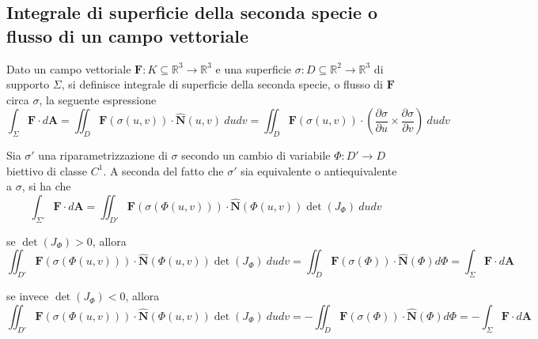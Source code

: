     \subsection{Integrale di superficie della seconda specie o flusso di un campo vettoriale}
        Dato un campo vettoriale $\mathbf{F}: K \subseteq \mathbb{R}^{3} \rightarrow \mathbb{R}^{3}$ e una superficie $\sigma: D \subseteq \mathbb{R}^{2} \rightarrow \mathbb{R}^{3}$ di supporto $\Sigma$, si definisce integrale di superficie della seconda specie, o flusso di $\mathbf{F}$ circa $\sigma$, la seguente espressione
        \[
            \int_{\Sigma} \mathbf{F} \cdot d\mathbf{A} = \iint_{D} \mathbf{F}(\sigma(u, v)) \cdot \mathbf{\hat{N}}(u, v) \: du dv = \iint_{D} \mathbf{F}(\sigma(u, v)) \cdot \left( \frac{\partial \sigma}{\partial u} \times \frac{\partial \sigma}{\partial v} \right) \: du dv
        \]

        Sia $\sigma'$ una riparametrizzazione di $\sigma$ secondo un cambio di variabile $\Phi: D' \rightarrow D$ biettivo di classe $C^{1}$.
        A seconda del fatto che $\sigma'$ sia equivalente o antiequivalente a $\sigma$, si ha che
        \[
            \int_{\Sigma'} \mathbf{F} \cdot d\mathbf{A} = \iint_{D'} \mathbf{F}(\sigma(\Phi(u, v))) \cdot \mathbf{\hat{N}}(\Phi(u, v))  \det(J_{\Phi}) \: du dv
        \]

        se $\det(J_{\Phi}) > 0$, allora
        \[
            \iint_{D'} \mathbf{F}(\sigma(\Phi(u, v))) \cdot \mathbf{\hat{N}}(\Phi(u, v))  \det(J_{\Phi}) \: du dv = \iint_{D} \mathbf{F}(\sigma(\Phi)) \cdot \mathbf{\hat{N}}(\Phi) d \Phi = \int_{\Sigma} \mathbf{F} \cdot d \mathbf{A}
        \]

        se invece $\det(J_{\Phi}) < 0$, allora
        \[
            \iint_{D'} \mathbf{F}(\sigma(\Phi(u, v))) \cdot \mathbf{\hat{N}}(\Phi(u, v))  \det(J_{\Phi}) \: du dv = - \iint_{D} \mathbf{F}(\sigma(\Phi)) \cdot \mathbf{\hat{N}}(\Phi) d \Phi = - \int_{\Sigma} \mathbf{F} \cdot d \mathbf{A}
        \]

